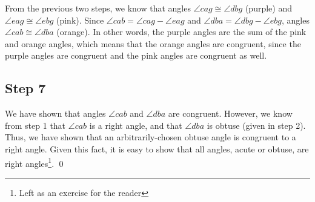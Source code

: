 \documentclass[11pt]{article}
\begin{document}
\vspace{.5cm}

From the previous two steps, we know that angles $\angle cag \cong \angle dbg$ (purple) and $\angle eag \cong \angle ebg$ (pink). Since $\angle cab = \angle cag - \angle eag$ and $\angle dba = \angle dbg - \angle ebg$, angles $\angle cab \cong \angle dba$ (orange). In other words, the purple angles are the sum of the pink and orange angles, which means that the orange angles are congruent, since the purple angles are congruent and the pink angles are congruent as well. 

\newpage


\subsection{Step 7}

\vspace{.5cm}

\begin{figure}[ht]
    \centering
\end{figure}

\vspace{.5cm}

We have shown that angles $\angle cab$ and $\angle dba$ are congruent. However, we know from step 1 that $\angle cab$ is a right angle, and that $\angle dba$ is obtuse (given in step 2). Thus, we have shown that an arbitrarily-chosen obtuse angle is congruent to a right angle. Given this fact, it is easy to show that all angles, acute or obtuse, are right angles\footnote{Left as an exercise for the reader}. \qed
\end{document}
